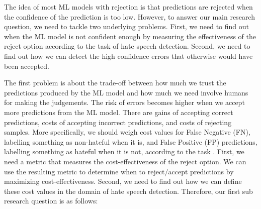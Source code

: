 
The idea of most ML models with rejection is that predictions are rejected when the confidence of the prediction is too low. However, to answer our main research question, we need to tackle two underlying problems. First, we need to find out when the ML model is not confident enough by measuring the effectiveness of the reject option according to the task of hate speech detection. Second, we need to find out how we can detect the high confidence errors that otherwise would have been accepted. 

The first problem is about the trade-off between how much we trust the predictions produced by the ML model and how much we need involve humans for making the judgements. The risk of errors becomes higher when we accept more predictions from the ML model. There are gains of accepting correct predictions, costs of accepting incorrect predictions, and costs of rejecting samples. More specifically, we should weigh cost values for False Negative (FN), labelling something as non-hateful when it is, and False Positive (FP) predictions, labelling something as hateful when it is not, according to the task \cite{sayin2021science}. First, we need a metric that measures the cost-effectiveness of the reject option. We can use the resulting metric to determine when to reject/accept predictions by maximizing cost-effectiveness. Second, we need to find out how we can define these cost values in the domain of hate speech detection. Therefore, our first sub research question is as follows:


